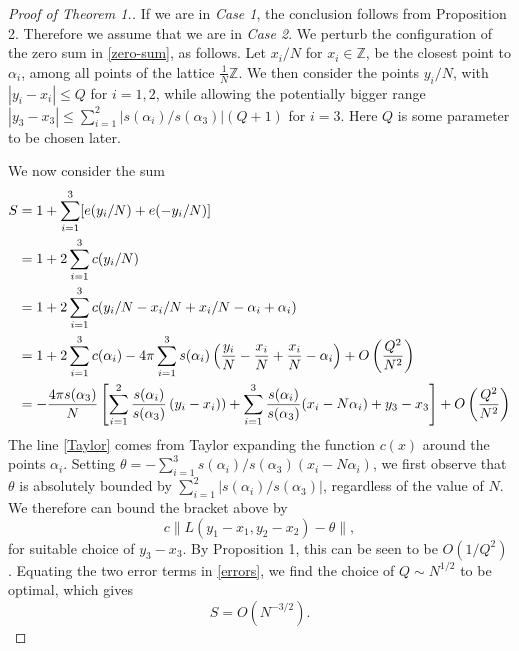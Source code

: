 \documentclass[12pt]{article}
\theoremstyle{definition}
\newcommand{\Z}{\mathbb{Z}}
\begin{document}
\begin{proof}[\textit{Proof of Theorem 1.}]
    If we are in \textit{Case 1}, the conclusion follows from Proposition 2. Therefore we assume that we are in \textit{Case 2}. We perturb the configuration of the zero sum in \eqref{zero-sum}, as follows. Let $x_i/N$ for $x_i\in \Z$, be the closest point to $\alpha_i$, among all points of the lattice $\frac{1}{N}\Z$. We then consider the points $y_i/N$, with $|y_i-x_i|\leq Q$ for $i=1,2$, while allowing the potentially bigger range $|y_3-x_3|\leq \sum_{i=1}^2 |s(\alpha_i)/s(\alpha_3)|(Q+1) $ for $i=3$. Here $Q$ is some parameter to be chosen later.

    We now consider the sum
    \begin{align}
        S&=1+\sum_{i=1}^3[e(y_i/N)+e(-y_i/N)]\\
        &=1+2\sum_{i=1}^3 c(y_i/N) \notag \\
        &=1+2\sum_{i=1}^3 c(y_i/N-x_i/N+x_i/N-\alpha_i+\alpha_i)\notag\\
        &=1+2\sum_{i=1}^3 c(\alpha_i)-4\pi\sum_{i=1}^3s(\alpha_i)\left( \frac{y_i}{N}-\frac{x_i}{N}+\frac{x_i}{N}-\alpha_i \right)+O\left(\frac{Q^2}{N^2}\right) \label{Taylor} \\
        &=-\frac{4\pi s(\alpha_3)}{N}\left[\sum_{i=1}^2\frac{s(\alpha_i)}{s(\alpha_3)}\left( y_i-x_i)  \right)+\sum_{i=1}^3\frac{s(\alpha_i)}{s(\alpha_3)}(x_i-N\alpha_i)+y_3-x_3  \right]+O\left(\frac{Q^2}{N^2}  \right)\label{errors}
    \end{align}
    The line \eqref{Taylor} comes from Taylor expanding the function $c(x)$ around the points $\alpha_i$. Setting $\theta=-\sum_{i=1}^3s(\alpha_i)/s(\alpha_3)(x_i-N\alpha_i)$, we first observe that $\theta$ is absolutely bounded by $\sum_{i=1}^2|s(\alpha_i)/s(\alpha_3)|$, regardless of the value of $N$. We therefore can bound the bracket above by
    \begin{equation}
        c\| L(y_1-x_1,y_2-x_2) -\theta \|,
    \end{equation}
    for suitable choice of $y_3-x_3$. By Proposition 1, this can be seen to be $O(1/Q^2)$. Equating the two error terms in \eqref{errors}, we find the choice of $Q\sim N^{1/2}$ to be optimal, which gives
    $$  S=O(N^{-3/2}). $$
\end{proof}
\end{document}

